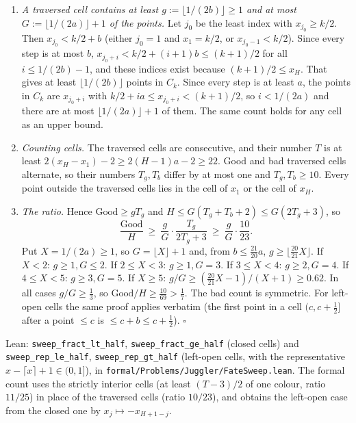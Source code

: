 \documentclass[11pt,a4paper]{article}
\begin{document}
\begin{enumerate}
\def\labelenumi{(\roman{enumi})}
\item
  \emph{A traversed cell contains at least
  \(g:=\lfloor 1/(2b)\rfloor\ge 1\) and at most
  \(G:=\lfloor 1/(2a)\rfloor+1\) of the points.} Let \(j_0\) be the
  least index with \(x_{j_0}\ge k/2\). Then \(x_{j_0}<k/2+b\) (either
  \(j_0=1\) and \(x_1=k/2\), or \(x_{j_0-1}<k/2\)). Since every step is
  at most \(b\), \(x_{j_0+i}<k/2+(i+1)b\le(k+1)/2\) for all
  \(i\le 1/(2b)-1\), and these indices exist because \((k+1)/2\le x_H\).
  That gives at least \(\lfloor 1/(2b)\rfloor\) points in \(C_k\). Since
  every step is at least \(a\), the points in \(C_k\) are \(x_{j_0+i}\)
  with \(k/2+ia\le x_{j_0+i}<(k+1)/2\), so \(i<1/(2a)\) and there are at
  most \(\lfloor 1/(2a)\rfloor+1\) of them. The same count holds for any
  cell as an upper bound.
\item
  \emph{Counting cells.} The traversed cells are consecutive, and their
  number \(T\) is at least \(2(x_H-x_1)-2\ge 2(H-1)a-2\ge 22\). Good and
  bad traversed cells alternate, so their numbers \(T_g,T_b\) differ by
  at most one and \(T_g,T_b\ge 10\). Every point outside the traversed
  cells lies in the cell of \(x_1\) or the cell of \(x_H\).
\item
  \emph{The ratio.} Hence \(\mathrm{Good}\ge gT_g\) and
  \(H\le G(T_g+T_b+2)\le G(2T_g+3)\), so \[
  \frac{\mathrm{Good}}H\ \ge\ \frac gG\cdot\frac{T_g}{2T_g+3}\ \ge\ \frac gG\cdot\frac{10}{23}.
  \] Put \(X=1/(2a)\ge 1\), so \(G=\lfloor X\rfloor+1\) and, from
  \(b\le\tfrac{21}{20}a\), \(g\ge\lfloor\tfrac{20}{21}X\rfloor\). If
  \(X<2\): \(g\ge 1,G\le 2\). If \(2\le X<3\): \(g\ge 1,G=3\). If
  \(3\le X<4\): \(g\ge 2,G=4\). If \(4\le X<5\): \(g\ge 3,G=5\). If
  \(X\ge 5\): \(g/G\ge(\tfrac{20}{21}X-1)/(X+1)\ge 0.62\). In all cases
  \(g/G\ge\tfrac13\), so \(\mathrm{Good}/H\ge\tfrac{10}{69}>\tfrac17\).
  The bad count is symmetric. For left-open cells the same proof applies
  verbatim (the first point in a cell \((c,c+\tfrac12]\) after a point
  \(\le c\) is \(\le c+b\le c+\tfrac12\)). \(\square\)
\end{enumerate}

Lean: \texttt{\nolinkurl{sweep_fract_lt_half}},
\texttt{\nolinkurl{sweep_fract_ge_half}} (closed cells) and
\texttt{\nolinkurl{sweep_rep_le_half}},
\texttt{\nolinkurl{sweep_rep_gt_half}} (left-open cells, with the
representative \(x-\lceil x\rceil+1\in(0,1]\)), in
\texttt{\nolinkurl{formal/Problems/Juggler/FateSweep.lean}}. The formal
count uses the strictly interior cells (at least \((T-3)/2\) of one
colour, ratio \(11/25\)) in place of the traversed cells (ratio
\(10/23\)), and obtains the left-open case from the closed one by
\(x_j\mapsto -x_{H+1-j}\).
\end{document}
